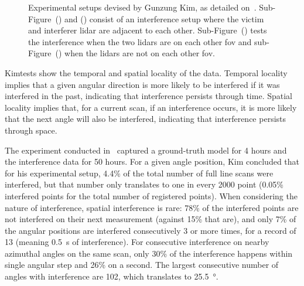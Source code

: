 \begin{figure}[!ht]
	\caption[Experimental setups used by Kim\etal and Popko\etal for 2D \acs{lidar} interference studies.]{Experimental setups devised by Gunzung Kim\etal, as detailed on~\cite{Kim2017}. Sub-Figure~() and () consist of an interference setup where the victim and interferer \ac{lidar} are adjacent to each other. Sub-Figure~() tests the interference when the two \acp{lidar} are on each other \ac{fov} and sub-Figure~() when the \acp{lidar} are not on each other \ac{fov}.}
	\label{fig:kim-setups}
\end{figure}



Kim\etal tests show the temporal and spatial locality of the data. Temporal locality implies that a given angular direction is more likely to be interfered if it was interfered in the past, indicating that interference persists through time. Spatial locality implies that, for a current scan, if an interference occurs, it is more likely that the next angle will also be interfered, indicating that interference persists through space. 

The experiment conducted in~\cite{Kim2015a} captured a ground-truth model for 4 hours and the interference data for 50 hours. For a given angle position, Kim concluded that for his experimental setup, 4.4\% of the total number of full line scans were interfered, but that number only translates to one in every 2000 point (0.05\% interfered points for the total number of registered points). When considering the nature of interference, spatial interference is rare: 78\% of the interfered points are not interfered on their next measurement (against 15\% that are), and only 7\% of the angular positions are interfered consecutively 3 or more times, for a record of 13 (meaning \SI{0.5}{\second} of interference). For consecutive interference on nearby azimuthal angles on the same scan, only 30\% of the interference happens within single angular step and 26\% on a second. The largest consecutive number of angles with interference are 102, which translates to \SI{25.5}{\degree}.

